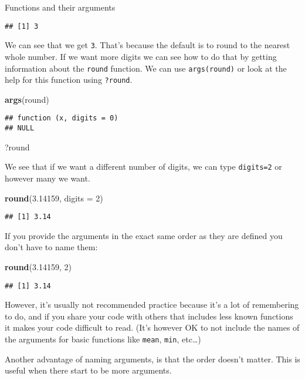 \documentclass[
  11pt,
  ignorenonframetext,
]{beamer}
\newenvironment{Shaded}{\begin{snugshade}}{\end{snugshade}}
\newcommand{\DataTypeTok}[1]{\textcolor[rgb]{0.13,0.29,0.53}{#1}}
\newcommand{\DecValTok}[1]{\textcolor[rgb]{0.00,0.00,0.81}{#1}}
\newcommand{\FloatTok}[1]{\textcolor[rgb]{0.00,0.00,0.81}{#1}}
\newcommand{\KeywordTok}[1]{\textcolor[rgb]{0.13,0.29,0.53}{\textbf{#1}}}
\newcommand{\NormalTok}[1]{#1}
\begin{document}
\begin{frame}[fragile]{Functions and their arguments}
\begin{verbatim}
## [1] 3
\end{verbatim}

We can see that we get \texttt{3}. That's because the default is to
round to the nearest whole number. If we want more digits we can see how
to do that by getting information about the \texttt{round} function. We
can use \texttt{args(round)} or look at the help for this function using
\texttt{?round}.

\begin{Shaded}
\begin{Highlighting}[]
\KeywordTok{args}\NormalTok{(round)}
\end{Highlighting}
\end{Shaded}

\begin{verbatim}
## function (x, digits = 0) 
## NULL
\end{verbatim}

\begin{Shaded}
\begin{Highlighting}[]
\NormalTok{?round}
\end{Highlighting}
\end{Shaded}

We see that if we want a different number of digits, we can type
\texttt{digits=2} or however many we want.

\begin{Shaded}
\begin{Highlighting}[]
\KeywordTok{round}\NormalTok{(}\FloatTok{3.14159}\NormalTok{, }\DataTypeTok{digits =} \DecValTok{2}\NormalTok{)}
\end{Highlighting}
\end{Shaded}

\begin{verbatim}
## [1] 3.14
\end{verbatim}

If you provide the arguments in the exact same order as they are defined
you don't have to name them:

\begin{Shaded}
\begin{Highlighting}[]
\KeywordTok{round}\NormalTok{(}\FloatTok{3.14159}\NormalTok{, }\DecValTok{2}\NormalTok{)}
\end{Highlighting}
\end{Shaded}

\begin{verbatim}
## [1] 3.14
\end{verbatim}

However, it's usually not recommended practice because it's a lot of
remembering to do, and if you share your code with others that includes
less known functions it makes your code difficult to read. (It's however
OK to not include the names of the arguments for basic functions like
\texttt{mean}, \texttt{min}, etc\ldots{})

Another advantage of naming arguments, is that the order doesn't matter.
This is useful when there start to be more arguments.

\end{frame}
\end{document}
